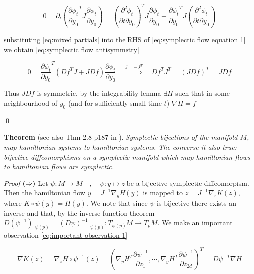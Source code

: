 \documentclass[12pt]{article}
\begin{document}
\begin{equation}\label{eq:symplectic flow equation 1}
    0 = \partial_t \left( \frac{\partial \phi_t}{\partial y_0}^T J \frac{\partial \phi_t}{\partial y_0} \right) = 
    \left( \frac{\partial^2 \phi_t}{\partial t\partial y_0} \right)^T J \frac{\partial \phi_t}{\partial y_0} + \frac{\partial \phi_t}{\partial y_0}^T J \left( \frac{\partial^2 \phi_t}{\partial t\partial y_0} \right)
\end{equation}

substituting \eqref{eq:mixed partials} into the RHS of \eqref{eq:symplectic flow equation 1} we obtain \eqref{eq:symplectic flow antisymmetry}

\begin{equation}\label{eq:symplectic flow antisymmetry}
    0 = \frac{\partial \phi_t}{\partial y_0}^T \left(
    Df^T J + JDf
    \right)\frac{\partial \phi_t}{\partial y_0}\quad \stackrel{J = -J^T}{\Longrightarrow}\quad Df^T J^T = (JDf)^T = JDf
\end{equation}

Thus $JDf$ is symmetric, by the integrability lemma $\exists H$ such that in some neighbourhood of $y_0$ (and for sufficiently small time $t$) $\nabla H = f$

\qed

\textbf{Theorem} (see also Thm 2.8 p187 in \cite{Numerical}). \textit{Symplectic bijections of the manifold $M$, map hamiltonian systems to hamiltonian systems. The converse it also true: bijective diffeomorphisms on a symplectic manifold which map hamiltonian flows to hamiltonian flows are symplectic.}

\textit{Proof} $(\Rightarrow)$ Let $\psi : M \to M \quad,\quad \psi : y\mapsto z$ be a bijective symplectic diffeomorpism. Then the hamiltonian flow $\dot y = J^{-1}\nabla_y H(y)$ is mapped to $\dot z = J^{-1}\nabla_z K(z)$, where $K \circ \psi(y) = H(y)$. We note that since $\psi$ is bijective there exists an inverse and that, by the inverse function theorem $D(\psi^{-1})\Big|_{\psi(p)} = (D\psi)^{-1}\Big|_{\psi(p)} : T_{\psi(p)}M \to T_pM$. We make an important observation \eqref{eq:important observation 1}

\begin{equation}\label{eq:important observation 1}
    \nabla K(z) = \nabla_z H\circ \psi^{-1}(z) = \left(\nabla_y H^T \frac{\partial \psi^{-1}}{\partial z_1},\cdots , \nabla_yH^T \frac{\partial \psi^{-1}}{\partial z_{2d}}\right)^T = D\psi^{-T} \nabla H
\end{equation}
\end{document}
